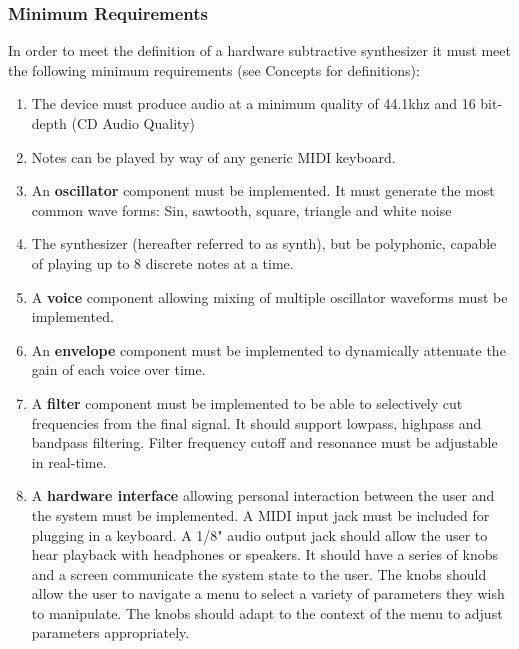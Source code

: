 \documentclass[acmlarge,screen]{acmart}
\begin{document}
	\subsubsection{Minimum Requirements}
	\label{requirements}
	In order to meet the definition of a hardware subtractive synthesizer it must meet the following minimum requirements (see Concepts for definitions):
	\begin{enumerate}
		\item The device must produce audio at a minimum quality of 44.1khz and 16 bit-depth (CD Audio Quality)
		\item Notes can be played by way of any generic MIDI keyboard.
		\item An \textbf{oscillator} component must be implemented. It must generate the most common wave forms: Sin, sawtooth, square, triangle and white noise
		\item The synthesizer (hereafter referred to as synth), but be polyphonic, capable of playing up to 8 discrete notes at a time.
		\item A \textbf{voice} component allowing mixing of multiple oscillator waveforms must be implemented.
		\item An \textbf{envelope} component must be implemented to dynamically attenuate the gain of each voice over time.
		\item A \textbf{filter} component must be implemented to be able to selectively cut frequencies from the final signal. It should support lowpass, highpass and bandpass filtering. Filter frequency cutoff and resonance must be adjustable in real-time.
		\item A \textbf{hardware interface} allowing personal interaction between the user and the system must be implemented. A MIDI input jack must be included for plugging in a keyboard. A 1/8" audio output jack should allow the user to hear playback with headphones or speakers. It should have a series of knobs and a screen communicate the system state to the user. The knobs should allow the user to navigate a menu to select a variety of parameters they wish to manipulate. The knobs should adapt to the context of the menu to adjust parameters appropriately.
	\end{enumerate} \cite{rise_2016}
\end{document}
